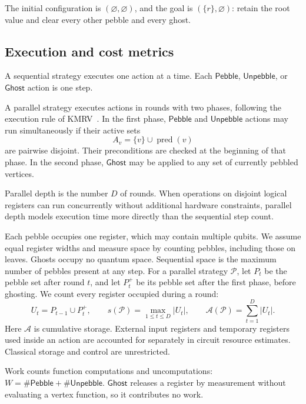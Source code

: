 \documentclass[11pt]{article}
\theoremstyle{definition}
\theoremstyle{remark}
\DeclareMathOperator{\pred}{pred}
\newcommand{\Peb}{\mathsf{Pebble}}
\newcommand{\Unp}{\mathsf{Unpebble}}
\newcommand{\Ghost}{\mathsf{Ghost}}
\newcommand{\Area}{\mathcal A}
\begin{document}
The initial configuration is $(\varnothing,\varnothing)$, and the goal is $(\{r\},\varnothing)$: retain the root value and clear every other pebble and every ghost.


\subsection{Execution and cost metrics}
\label{sec:work-counts}

A sequential strategy executes one action at a time. Each $\Peb$, $\Unp$, or $\Ghost$ action is one step.

A parallel strategy executes actions in rounds with two phases, following the execution rule of KMRV~\cite[Section~2.1]{KMRV2026}. In the first phase, $\Peb$ and $\Unp$ actions may run simultaneously if their active sets
\begin{equation}
A_v=\{v\}\cup\pred(v)
\label{eq:active-set}
\end{equation}
are pairwise disjoint. Their preconditions are checked at the beginning of that phase. In the second phase, $\Ghost$ may be applied to any set of currently pebbled vertices.

Parallel depth is the number $D$ of rounds. When operations on disjoint logical registers can run concurrently without additional hardware constraints, parallel depth models execution time more directly than the sequential step count.

Each pebble occupies one register, which may contain multiple qubits. We assume equal register widths and measure space by counting pebbles, including those on leaves. Ghosts occupy no quantum space. Sequential space is the maximum number of pebbles present at any step. For a parallel strategy $\mathcal P$, let $P_t$ be the pebble set after round $t$, and let $P_t^+$ be its pebble set after the first phase, before ghosting. We count every register occupied during a round:
\begin{equation}
U_t=P_{t-1}\cup P_t^+, \qquad
s(\mathcal P)=\max_{1\le t\le D}|U_t|, \qquad
\Area(\mathcal P)=\sum_{t=1}^D|U_t|.
\label{eq:parallel-resources}
\end{equation}
Here $\Area$ is cumulative storage. External input registers and temporary registers used inside an action are accounted for separately in circuit resource estimates. Classical storage and control are unrestricted.

Work counts function computations and uncomputations:
$W=\#\Peb+\#\Unp$.
$\Ghost$ releases a register by measurement without evaluating a vertex function, so it contributes no work.
\end{document}
